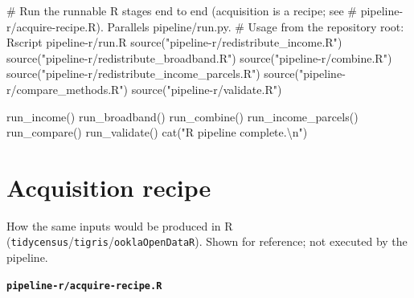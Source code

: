 \documentclass[
  letterpaper,
  DIV=11,
  numbers=noendperiod]{scrreprt}
\newenvironment{Shaded}{\begin{snugshade}}{\end{snugshade}}
\newcommand{\CommentTok}[1]{\textcolor[rgb]{0.37,0.37,0.37}{#1}}
\newcommand{\FunctionTok}[1]{\textcolor[rgb]{0.28,0.35,0.67}{#1}}
\newcommand{\NormalTok}[1]{\textcolor[rgb]{0.00,0.23,0.31}{#1}}
\newcommand{\SpecialCharTok}[1]{\textcolor[rgb]{0.37,0.37,0.37}{#1}}
\newcommand{\StringTok}[1]{\textcolor[rgb]{0.13,0.47,0.30}{#1}}
\begin{document}
\begin{Shaded}
\begin{Highlighting}[]
\CommentTok{\# Run the runnable R stages end to end (acquisition is a recipe; see}
\CommentTok{\# pipeline{-}r/acquire{-}recipe.R). Parallels pipeline/run.py.}
\CommentTok{\# Usage from the repository root: Rscript pipeline{-}r/run.R}
\FunctionTok{source}\NormalTok{(}\StringTok{"pipeline{-}r/redistribute\_income.R"}\NormalTok{)}
\FunctionTok{source}\NormalTok{(}\StringTok{"pipeline{-}r/redistribute\_broadband.R"}\NormalTok{)}
\FunctionTok{source}\NormalTok{(}\StringTok{"pipeline{-}r/combine.R"}\NormalTok{)}
\FunctionTok{source}\NormalTok{(}\StringTok{"pipeline{-}r/redistribute\_income\_parcels.R"}\NormalTok{)}
\FunctionTok{source}\NormalTok{(}\StringTok{"pipeline{-}r/compare\_methods.R"}\NormalTok{)}
\FunctionTok{source}\NormalTok{(}\StringTok{"pipeline{-}r/validate.R"}\NormalTok{)}

\FunctionTok{run\_income}\NormalTok{()}
\FunctionTok{run\_broadband}\NormalTok{()}
\FunctionTok{run\_combine}\NormalTok{()}
\FunctionTok{run\_income\_parcels}\NormalTok{()}
\FunctionTok{run\_compare}\NormalTok{()}
\FunctionTok{run\_validate}\NormalTok{()}
\FunctionTok{cat}\NormalTok{(}\StringTok{"R pipeline complete.}\SpecialCharTok{\textbackslash{}n}\StringTok{"}\NormalTok{)}
\end{Highlighting}
\end{Shaded}

\section{Acquisition recipe}\label{acquisition-recipe}

How the same inputs would be produced in R
(\texttt{tidycensus}/\texttt{tigris}/\texttt{ooklaOpenDataR}). Shown for
reference; not executed by the pipeline.

\textbf{\texttt{pipeline-r/acquire-recipe.R}}
\end{document}
